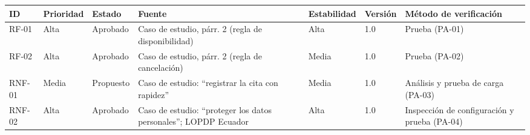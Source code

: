 \documentclass[11pt,a4paper,oneside]{article}
\begin{document}
{		\begin{center}
			\begin{tabularx}{\textwidth}{|C{1.3cm}|C{1.4cm}|C{1.7cm}|L{2.5cm}|C{1.6cm}|C{1.2cm}|Y|}
				\hline
				\textbf{ID} & \textbf{Prioridad} & \textbf{Estado} & \textbf{Fuente} & \textbf{Estabilidad} & \textbf{Versión} & \textbf{Método de verificación} \\ \hline
				RF-01 & Alta & Aprobado & Caso de estudio, párr. 2 (regla de disponibilidad) & Alta & 1.0 & Prueba (PA-01) \\ \hline
				RF-02 & Alta & Aprobado & Caso de estudio, párr. 2 (regla de cancelación) & Media & 1.0 & Prueba (PA-02) \\ \hline
				RNF-01 & Media & Propuesto & Caso de estudio: ``registrar la cita con rapidez'' & Media & 1.0 & Análisis y prueba de carga (PA-03) \\ \hline
				RNF-02 & Alta & Aprobado & Caso de estudio: ``proteger los datos personales''; LOPDP Ecuador & Alta & 1.0 & Inspección de configuración y prueba (PA-04) \\ \hline
			\end{tabularx}
	\end{center}}
	
	\newpage
	
	\vspace{4pt}
	
\end{document}
